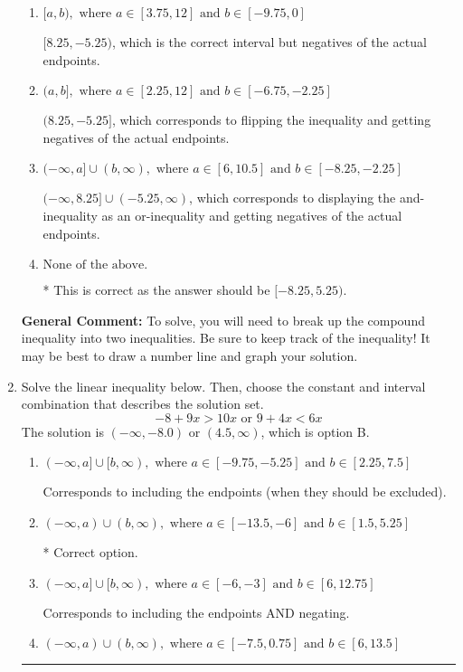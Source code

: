 \documentclass{extbook}[14pt]
\newcommand{\litem}[1]{\item #1

\rule{\textwidth}{0.4pt}}
\begin{document}
\begin{enumerate}
{\begin{enumerate}[label=\Alph*.]
$(-\infty, 8.25) \cup [-5.25, \infty)$, which corresponds to displaying the and-inequality as an or-inequality AND flipping the inequality AND getting negatives of the actual endpoints.
\item \( [a, b), \text{ where } a \in [3.75, 12] \text{ and } b \in [-9.75, 0] \)

$[8.25, -5.25)$, which is the correct interval but negatives of the actual endpoints.
\item \( (a, b], \text{ where } a \in [2.25, 12] \text{ and } b \in [-6.75, -2.25] \)

$(8.25, -5.25]$, which corresponds to flipping the inequality and getting negatives of the actual endpoints.
\item \( (-\infty, a] \cup (b, \infty), \text{ where } a \in [6, 10.5] \text{ and } b \in [-8.25, -2.25] \)

$(-\infty, 8.25] \cup (-5.25, \infty)$, which corresponds to displaying the and-inequality as an or-inequality and getting negatives of the actual endpoints.
\item \( \text{None of the above.} \)

* This is correct as the answer should be $[-8.25, 5.25)$.
\end{enumerate}

\textbf{General Comment:} To solve, you will need to break up the compound inequality into two inequalities. Be sure to keep track of the inequality! It may be best to draw a number line and graph your solution.
}
\litem{
Solve the linear inequality below. Then, choose the constant and interval combination that describes the solution set.
\[ -8 + 9 x > 10 x \text{ or } 9 + 4 x < 6 x \]The solution is \( (-\infty, -8.0) \text{ or } (4.5, \infty) \), which is option B.\begin{enumerate}[label=\Alph*.]
\item \( (-\infty, a] \cup [b, \infty), \text{ where } a \in [-9.75, -5.25] \text{ and } b \in [2.25, 7.5] \)

Corresponds to including the endpoints (when they should be excluded).
\item \( (-\infty, a) \cup (b, \infty), \text{ where } a \in [-13.5, -6] \text{ and } b \in [1.5, 5.25] \)

 * Correct option.
\item \( (-\infty, a] \cup [b, \infty), \text{ where } a \in [-6, -3] \text{ and } b \in [6, 12.75] \)

Corresponds to including the endpoints AND negating.
\item \( (-\infty, a) \cup (b, \infty), \text{ where } a \in [-7.5, 0.75] \text{ and } b \in [6, 13.5] \)


\end{enumerate}}
\end{enumerate}
\end{document}
